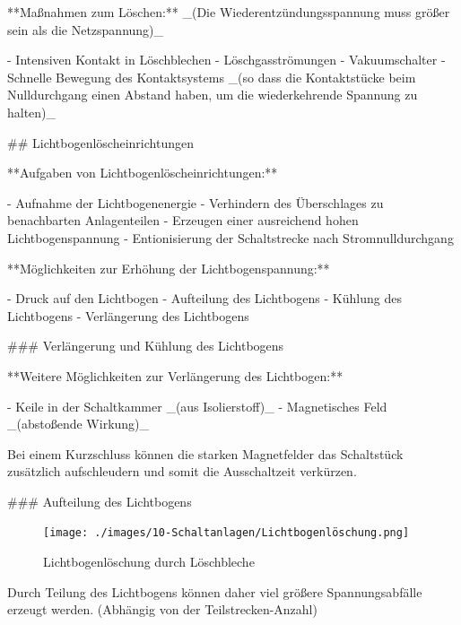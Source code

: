 \begin{markdown}
**Maßnahmen zum Löschen:** _(Die Wiederentzündungsspannung muss größer sein als die Netzspannung)_

- Intensiven Kontakt in Löschblechen
- Löschgasströmungen
- Vakuumschalter
- Schnelle Bewegung des Kontaktsystems _(so dass die Kontaktstücke beim Nulldurchgang einen Abstand haben, um die wiederkehrende Spannung zu halten)_

\vspace{3em}

## Lichtbogenlöscheinrichtungen

**Aufgaben von Lichtbogenlöscheinrichtungen:**

- Aufnahme der Lichtbogenenergie
- Verhindern des Überschlages zu benachbarten Anlagenteilen
- Erzeugen einer ausreichend hohen Lichtbogenspannung
- Entionisierung der Schaltstrecke nach Stromnulldurchgang

**Möglichkeiten zur Erhöhung der Lichtbogenspannung:**

- Druck auf den Lichtbogen
- Aufteilung des Lichtbogens
- Kühlung des Lichtbogens
- Verlängerung des Lichtbogens

### Verlängerung und Kühlung des Lichtbogens


**Weitere Möglichkeiten zur Verlängerung des Lichtbogen:**

- Keile in der Schaltkammer _(aus Isolierstoff)_
- Magnetisches Feld _(abstoßende Wirkung)_

Bei einem Kurzschluss können die starken Magnetfelder das Schaltstück zusätzlich aufschleudern und somit die Ausschaltzeit verkürzen.

\newpage

### Aufteilung des Lichtbogens


\begin{figure}
    \vspace{-1em}
    \centering
    \texttt{[image: ./images/10-Schaltanlagen/Lichtbogenlöschung.png]}
    \caption[Lichtbogenlöschung durch Löschbleche]{Lichtbogenlöschung durch Löschbleche}
\end{figure}

Durch Teilung des Lichtbogens können daher viel größere Spannungsabfälle erzeugt werden. (Abhängig von der Teilstrecken-Anzahl)


\end{markdown}
